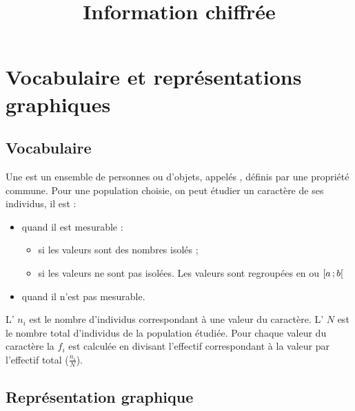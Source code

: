 \documentclass[12pt,a4paper]{article}
\date{}
\title{Information chiffrée }
\begin{document}




\section{Vocabulaire et représentations graphiques}

\subsection{Vocabulaire}

\begin{mydefs}
	Une  est un ensemble de personnes ou d'objets, appelés , définis par une propriété commune. 
	Pour une population choisie, on peut étudier un caractère de ses individus, il est :
	
	\begin{itemize}
		\item {} quand il est mesurable :
		\begin{itemize}
			\item {} si les valeurs sont des nombres isolés ;
			\item {} si les valeurs ne sont pas isolées. Les valeurs sont regroupées en  ou   $\mbox{\ensuremath{\left[a\mathpunct{};b\right[}}$ %
		\end{itemize}
		\item {} quand il n'est pas mesurable. %
	\end{itemize}

	L' $n_i$ est le nombre d'individus correspondant à une valeur du caractère. L' $N$ est le nombre total d'individus de la population étudiée.
	Pour chaque valeur du caractère la  $f_i$ est calculée en divisant l'effectif correspondant à la valeur par l'effectif total  ($\frac{n_i}{N}$).
\end{mydefs}

\subsection{Représentation graphique}
\end{document}
